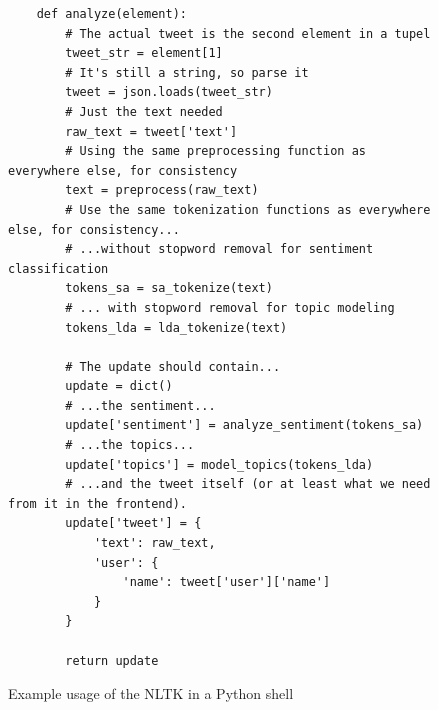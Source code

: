\begin{figure}
    \caption{Example usage of the NLTK in a Python shell}
    \label{code:nltk}
    \begin{verbatim}
    def analyze(element):
        # The actual tweet is the second element in a tupel
        tweet_str = element[1]
        # It's still a string, so parse it
        tweet = json.loads(tweet_str)
        # Just the text needed
        raw_text = tweet['text']
        # Using the same preprocessing function as everywhere else, for consistency
        text = preprocess(raw_text)
        # Use the same tokenization functions as everywhere else, for consistency...
        # ...without stopword removal for sentiment classification
        tokens_sa = sa_tokenize(text)
        # ... with stopword removal for topic modeling
        tokens_lda = lda_tokenize(text)

        # The update should contain...
        update = dict()
        # ...the sentiment...
        update['sentiment'] = analyze_sentiment(tokens_sa)
        # ...the topics...
        update['topics'] = model_topics(tokens_lda)
        # ...and the tweet itself (or at least what we need from it in the frontend).
        update['tweet'] = {
            'text': raw_text,
            'user': {
                'name': tweet['user']['name']
            }
        }

        return update
    \end{verbatim}
\end{figure}

